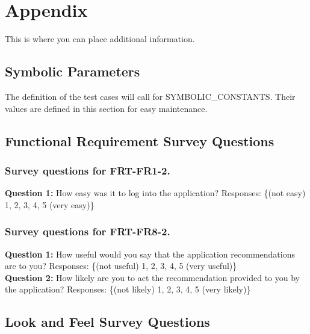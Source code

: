 \documentclass[12pt, titlepage]{article}
\begin{document}
\newpage

\section{Appendix}

This is where you can place additional information.

\subsection{Symbolic Parameters}

The definition of the test cases will call for SYMBOLIC\_CONSTANTS.
Their values are defined in this section for easy maintenance.

\subsection{Functional Requirement Survey Questions}
\subsubsection{Survey questions for \textbf{FRT-FR1-2}.}

\noindent \textbf{Question 1:} How easy was it to log into the application?
Responses: \{(not easy) 1, 2, 3, 4, 5 (very easy)\} \\

\subsubsection{Survey questions for \textbf{FRT-FR8-2}.}

\noindent \textbf{Question 1:} How useful would you say that the application recommendations are to you?
Responses: \{(not useful) 1, 2, 3, 4, 5 (very useful)\} \\

\noindent \textbf{Question 2:} How likely are you to act the recommendation provided to you by the application?
Responses: \{(not likely) 1, 2, 3, 4, 5 (very likely)\}

\subsection{Look and Feel Survey Questions}
\end{document}
